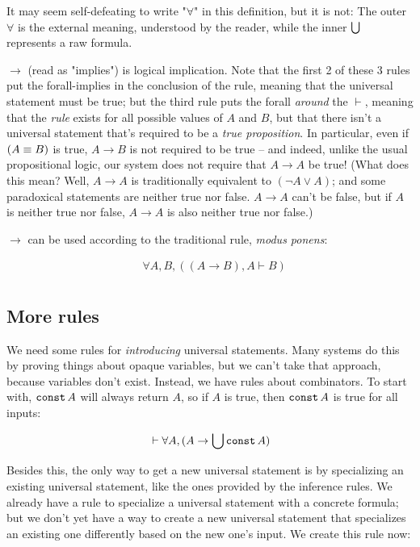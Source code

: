 \documentclass{article}
\begin{document}
  It may seem self-defeating to write "$\forall$" in this definition, but it is not: The outer $\forall$ is the external meaning, understood by the reader, while the inner $\bigcup$ represents a raw formula.
  
  
    
  $\to$ (read as "implies") is logical implication. Note that the first 2 of these 3 rules put the forall-implies in the conclusion of the rule, meaning that the universal statement must be true; but the third rule puts the forall \emph{around} the $\vdash$, meaning that the \emph{rule} exists for all possible values of $A$ and $B$, but that there isn't a universal statement that's required to be a \emph{true proposition}. In particular, even if $(A \equiv B)$ is true, $A \to B$ is not required to be true – and indeed, unlike the usual propositional logic, our system does not require that $A \to A$ be true! (What does this mean? Well, $A \to A$ is traditionally equivalent to $(\neg A \vee A)$; and some paradoxical statements are neither true nor false. $A \to A$ can't be false, but if $A$ is neither true nor false, $A \to A$ is also neither true nor false.)
  
  $\to$ can be used according to the traditional rule, \emph{modus ponens}:
  
  \begin{align*}
    &\forall A,B, ((A \to B), A \vdash B)\\
  \end{align*}
  
    
  \subsection{More rules}
  
  We need some rules for \emph{introducing} universal statements. Many systems do this by proving things about opaque variables, but we can't take that approach, because variables don't exist. Instead, we have rules about combinators. To start with, $\operatorname{\texttt{const}} A$ will always return $A$, so if $A$ is true, then $\operatorname{\texttt{const}} A$ is true for all inputs:
  
  \begin{align*}
    &\vdash \forall A, (A \to \bigcup \operatorname{\texttt{const}} A)\\
  \end{align*}
  
  Besides this, the only way to get a new universal statement is by specializing an existing universal statement, like the ones provided by the inference rules. We already have a rule to specialize a universal statement with a concrete formula; but we don't yet have a way to create a new universal statement that specializes an existing one differently based on the new one's input. We create this rule now:
  
\end{document}
